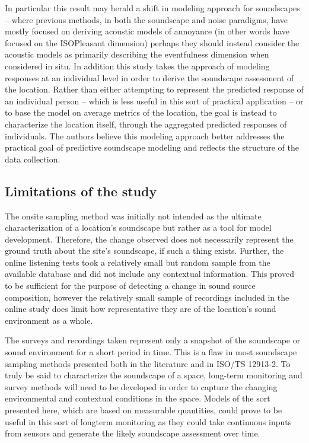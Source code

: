In particular this result may herald a shift in modeling approach for soundscapes – where previous methods, in both the soundscape and noise paradigms, have mostly focused on deriving acoustic models of annoyance (in other words have focused on the ISOPleasant dimension) perhaps they should instead consider the acoustic models as primarily describing the eventfulness dimension when considered in situ. In addition this study takes the approach of modeling responses at an individual level in order to derive the soundscape assessment of the location. Rather than either attempting to represent the predicted response of an individual person -- which is less useful in this sort of practical application -- or to base the model on average metrics of the location, the goal is instead to characterize the location itself, through the aggregated predicted responses of individuals. The authors believe this modeling approach better addresses the practical goal of predictive soundscape modeling and reflects the structure of the data collection.

\subsection{Limitations of the study}
The onsite sampling method was initially not intended as the ultimate characterization of a location's soundscape but rather as a tool for model development. Therefore, the change observed does not necessarily represent the ground truth about the site's soundscape, if such a thing exists. Further, the online listening tests took a relatively small but random sample from the available database and did not include any contextual information. This proved to be sufficient for the purpose of detecting a change in sound source composition, however the relatively small sample of recordings included in the online study does limit how representative they are of the location's sound environment as a whole.

The surveys and recordings taken represent only a snapshot of the soundscape or sound environment for a short period in time. This is a flaw in most soundscape sampling methods presented both in the literature and in ISO/TS 12913-2. To truly be said to characterize the soundscape of a space, long-term monitoring and survey methods will need to be developed in order to capture the changing environmental and contextual conditions in the space. Models of the sort presented here, which are based on measurable quantities, could prove to be useful in this sort of longterm monitoring as they could take continuous inputs from sensors and generate the likely soundscape assessment over time.

